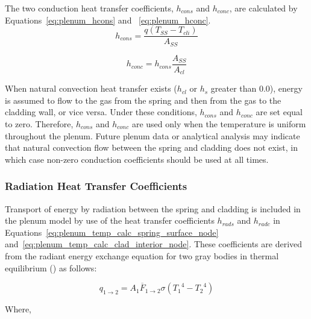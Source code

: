 The two conduction heat transfer coefficients, $h_{cons}$ and $h_{conc}$, are calculated by
Equations~\ref{eq:plenum_hcons} and ~\ref{eq:plenum_hconc}.
\begin{equation}
    \label{eq:plenum_hcons}
    h_{cons} = \frac{q\left( T_{SS} - T_{cli} \right)}{A_{SS}}
\end{equation}

\begin{equation}
    \label{eq:plenum_hconc}
    h_{conc} = h_{cons}\frac{A_{SS}}{A_{cl}}
\end{equation}

When natural convection heat transfer exists (\(h_{cl}\) or \(h_{s}\) greater than 0.0), energy is
assumed to flow to the gas from the spring and then from the gas to the cladding wall, or vice
versa.  Under these conditions, \(h_{cons}\) and \(h_{conc}\) are set equal to zero. Therefore,
\(h_{cons}\) and \(h_{conc}\) are used only when the temperature is uniform throughout the plenum.
Future plenum data or analytical analysis may indicate that natural convection flow between the
spring and cladding does not exist, in which case non-zero conduction coefficients should be used at
all times.
\subsubsection{Radiation Heat Transfer Coefficients}\label{radiation-heat-transfer-coefficients}

Transport of energy by radiation between the spring and cladding is included in the plenum model by
use of the heat transfer coefficients \(h_{rads}\) and \(h_{radc}\) in
Equations~\ref{eq:plenum_temp_calc_spring_surface_node}
and~\ref{eq:plenum_temp_calc_clad_interior_node}.  These coefficients are derived from the radiant
energy exchange equation for two gray bodies in thermal equilibrium (\cite{ref:Kreith1964a})
as follows:

\begin{equation}
    \label{eq:plenum_net_rate_heat_flow_radiation}
    q_{1 \rightarrow 2} = A_{1}{\overline{F}}_{1 \rightarrow 2}\sigma\left( {T_{1}}^{4} - {T_{2}}^{4} \right)
\end{equation}

Where, 

